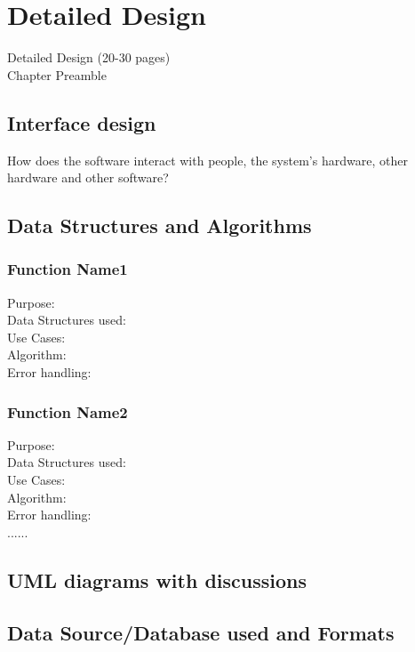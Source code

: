 \chapter{Detailed Design}
\graphicspath{{DetailedDesign/DetailedDesignFigs/EPS/}{DetailedDesign/DetailedDesignFigs/}}

Detailed Design (20-30 pages)\\
Chapter Preamble\\

\section{Interface design}
How does the software interact with people, the system's hardware, other hardware and other software?
\section{Data Structures and Algorithms}
\subsection{Function Name1}
Purpose:\\
Data Structures used:\\
Use Cases:\\
Algorithm:\\
Error handling:
\subsection{Function Name2}
Purpose:\\
Data Structures used:\\
Use Cases:\\
Algorithm:\\
Error handling:\\
......
\section{UML diagrams with discussions}
\section{Data Source/Database used and Formats}





